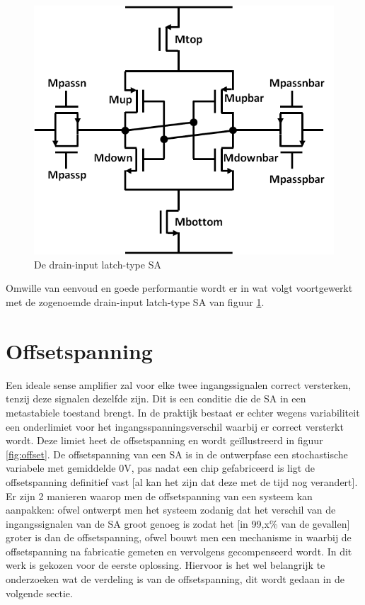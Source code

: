 \begin{figure}
  \centering
  \includegraphics[scale=0.4]{../fig/hfdstk-sensamp-ourSA.png}
  \caption[De drain-input latch-type SA]{De drain-input latch-type SA}
  \label{fig:ourSA}
\end{figure}

Omwille van eenvoud en goede performantie\cite{Cos09} wordt er in wat volgt voortgewerkt met de zogenoemde drain-input latch-type SA van figuur \ref{fig:ourSA}.


\section{Offsetspanning}
Een ideale sense amplifier zal voor elke twee ingangssignalen correct versterken, tenzij deze signalen dezelfde zijn. Dit is een conditie die de SA in een metastabiele toestand brengt. In de praktijk bestaat er echter wegens variabiliteit een onderlimiet voor het ingangsspanningsverschil waarbij er correct versterkt wordt. Deze limiet heet de offsetspanning en wordt geïllustreerd in figuur \ref{fig:offset}. De offsetspanning van een SA is in de ontwerpfase een stochastische variabele met gemiddelde 0V, pas nadat een chip gefabriceerd is ligt de offsetspanning definitief vast [al kan het zijn dat deze met de tijd nog verandert].\\
Er zijn 2 manieren waarop men de offsetspanning van een systeem kan aanpakken: ofwel ontwerpt men het systeem zodanig dat het verschil van de ingangssignalen van de SA groot genoeg is zodat het [in 99,x\% van de gevallen] groter is dan de offsetspanning, ofwel bouwt men een mechanisme in waarbij de offsetspanning na fabricatie gemeten en vervolgens gecompenseerd wordt. In dit werk is gekozen voor de eerste oplossing.
Hiervoor is het wel belangrijk te onderzoeken wat de verdeling is van de offsetspanning, dit wordt gedaan in de volgende sectie.

